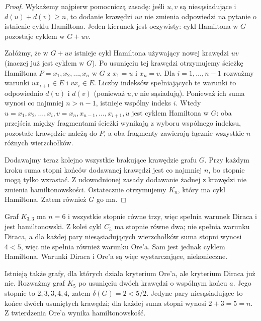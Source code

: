 \begin{proof}
Wykażemy najpierw pomocniczą zasadę: jeśli $u,v$
są niesąsiadujące i $d(u)+d(v)\ge n$, to
dodanie krawędzi $uv$ nie zmienia odpowiedzi
na pytanie o istnienie cyklu Hamiltona.
Jeden kierunek jest oczywisty: cykl Hamiltona
w $G$ pozostaje cyklem w $G+uv$.

Załóżmy, że w $G+uv$ istnieje cykl Hamiltona
używający nowej krawędzi $uv$ (inaczej już jest
cyklem w $G$). Po usunięciu tej krawędzi otrzymujemy
ścieżkę Hamiltona $P=x_1,x_2,\ldots,x_n$ w $G$
z $x_1=u$ i $x_n=v$. Dla $i=1,\ldots,n-1$
rozważmy warunki $ux_{i+1}\in E$ i $vx_i\in E$.
Liczby indeksów spełniających te warunki to
odpowiednio $d(u)$ i $d(v)$ (ponieważ $u,v$
nie sąsiadują). Ponieważ ich suma wynosi co
najmniej $n>n-1$, istnieje wspólny indeks $i$.
Wtedy
$u=x_1,x_2,\ldots,x_i,v=x_n,x_{n-1},\ldots,x_{i+1},u$
jest cyklem Hamiltona w $G$: oba przejścia między
fragmentami ścieżki wynikają z wyboru wspólnego indeksu,
pozostałe krawędzie należą do $P$, a oba fragmenty
zawierają łącznie wszystkie $n$ różnych wierzchołków.

Dodawajmy teraz kolejno wszystkie brakujące
krawędzie grafu $G$. Przy każdym kroku suma stopni
końców dodawanej krawędzi jest co najmniej $n$,
bo stopnie mogą tylko wzrastać. Z udowodnionej
zasady dodawanie żadnej z krawędzi nie zmienia
hamiltonowskości. Ostatecznie otrzymujemy $K_n$,
który ma cykl Hamiltona. Zatem również $G$ go ma.
\end{proof}

\begin{przyklad}
Graf $K_{3,3}$ ma $n=6$ i wszystkie stopnie równe trzy,
więc spełnia warunek Diraca i jest hamiltonowski.
Z kolei cykl $C_5$ ma stopnie równe dwa; nie spełnia
warunku Diraca, a dla każdej pary niesąsiadujących
wierzchołków suma stopni wynosi $4<5$, więc nie spełnia
również warunku Ore'a. Sam jest jednak cyklem Hamiltona.
Warunki Diraca i Ore'a są więc wystarczające, niekonieczne.

Istnieją także grafy, dla których działa kryterium Ore'a,
ale kryterium Diraca już nie. Rozważmy graf $K_5$
po usunięciu dwóch krawędzi o wspólnym końcu $a$.
Jego stopnie to $2,3,3,4,4$, zatem
$\delta(G)=2<5/2$. Jedyne pary niesąsiadujące
to końce dwóch usuniętych krawędzi; dla każdej
suma stopni wynosi $2+3=5=n$.
Z twierdzenia Ore'a wynika hamiltonowskość.
\end{przyklad}

\begin{center}
\end{center}

